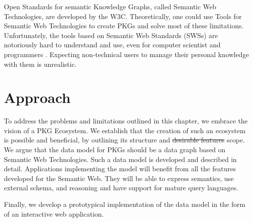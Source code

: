 Open Standards for semantic Knowledge Graphs, called Semantic Web Technologies, are developed by the W3C. Theoretically, one could use Tools for Semantic Web Technologies to create PKGs and solve most of these limitations. Unfortunately, the tools based on Semantic Web Standards (SWSs) are notoriously hard to understand and use, even for computer scientist and programmers \cite{EasierRDF}. Expecting non-technical users to manage their personal knowledge with them is unrealistic.

\section{Approach}
To address the problems and limitations outlined in this chapter, we embrace the vision of a PKG Ecosystem. We establish that the creation of such an ecosystem is possible and beneficial, by outlining its structure and \sout{desirable features} scope. We argue that the data model for PKGs should be a data graph based on Semantic Web Technologies. Such a data model is developed and described in detail. Applications implementing the model will benefit from all the features developed for the Semantic Web. They will be able to express semantics, use external schema, and reasoning and have support for mature query languages. 

Finally, we develop a prototypical implementation of the data model in the form of an interactive web application.



